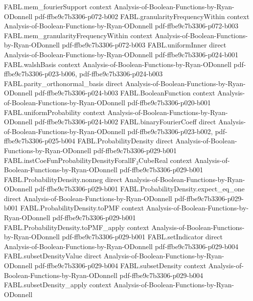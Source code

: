 \begin{theorem}
\proofstep
  {FABL.mem_fourierSupport}
  {context}
  {Analysis-of-Boolean-Functions-by-Ryan-ODonnell}
  {pdf-ffbe9c7b3306-p072-b002}
\proofstep
  {FABL.granularityFrequencyWithin}
  {context}
  {Analysis-of-Boolean-Functions-by-Ryan-ODonnell}
  {pdf-ffbe9c7b3306-p072-b003}
\proofstep
  {FABL.mem_granularityFrequencyWithin}
  {context}
  {Analysis-of-Boolean-Functions-by-Ryan-ODonnell}
  {pdf-ffbe9c7b3306-p072-b003}
\proofstep
  {FABL.uniformInner}
  {direct}
  {Analysis-of-Boolean-Functions-by-Ryan-ODonnell}
  {pdf-ffbe9c7b3306-p024-b001}
\proofstep
  {FABL.walshBasis}
  {context}
  {Analysis-of-Boolean-Functions-by-Ryan-ODonnell}
  {pdf-ffbe9c7b3306-p023-b006,
    pdf-ffbe9c7b3306-p024-b003}
\proofstep
  {FABL.parity_orthonormal_basis}
  {direct}
  {Analysis-of-Boolean-Functions-by-Ryan-ODonnell}
  {pdf-ffbe9c7b3306-p024-b003}
\proofstep
  {FABL.BooleanFunction}
  {context}
  {Analysis-of-Boolean-Functions-by-Ryan-ODonnell}
  {pdf-ffbe9c7b3306-p020-b001}
\proofstep
  {FABL.uniformProbability}
  {context}
  {Analysis-of-Boolean-Functions-by-Ryan-ODonnell}
  {pdf-ffbe9c7b3306-p024-b002}
\proofstep
  {FABL.binaryFourierCoeff}
  {direct}
  {Analysis-of-Boolean-Functions-by-Ryan-ODonnell}
  {pdf-ffbe9c7b3306-p023-b002,
    pdf-ffbe9c7b3306-p025-b004}
\proofstep
  {FABL.ProbabilityDensity}
  {direct}
  {Analysis-of-Boolean-Functions-by-Ryan-ODonnell}
  {pdf-ffbe9c7b3306-p029-b001}
\proofstep
  {FABL.instCoeFunProbabilityDensityForallF₂CubeReal}
  {context}
  {Analysis-of-Boolean-Functions-by-Ryan-ODonnell}
  {pdf-ffbe9c7b3306-p029-b001}
\proofstep
  {FABL.ProbabilityDensity.nonneg}
  {direct}
  {Analysis-of-Boolean-Functions-by-Ryan-ODonnell}
  {pdf-ffbe9c7b3306-p029-b001}
\proofstep
  {FABL.ProbabilityDensity.expect_eq_one}
  {direct}
  {Analysis-of-Boolean-Functions-by-Ryan-ODonnell}
  {pdf-ffbe9c7b3306-p029-b001}
\proofstep
  {FABL.ProbabilityDensity.toPMF}
  {context}
  {Analysis-of-Boolean-Functions-by-Ryan-ODonnell}
  {pdf-ffbe9c7b3306-p029-b001}
\proofstep
  {FABL.ProbabilityDensity.toPMF_apply}
  {context}
  {Analysis-of-Boolean-Functions-by-Ryan-ODonnell}
  {pdf-ffbe9c7b3306-p029-b001}
\proofstep
  {FABL.setIndicator}
  {direct}
  {Analysis-of-Boolean-Functions-by-Ryan-ODonnell}
  {pdf-ffbe9c7b3306-p029-b004}
\proofstep
  {FABL.subsetDensityValue}
  {direct}
  {Analysis-of-Boolean-Functions-by-Ryan-ODonnell}
  {pdf-ffbe9c7b3306-p029-b004}
\proofstep
  {FABL.subsetDensity}
  {context}
  {Analysis-of-Boolean-Functions-by-Ryan-ODonnell}
  {pdf-ffbe9c7b3306-p029-b004}
\proofstep
  {FABL.subsetDensity_apply}
  {context}
  {Analysis-of-Boolean-Functions-by-Ryan-ODonnell}

\end{theorem}
